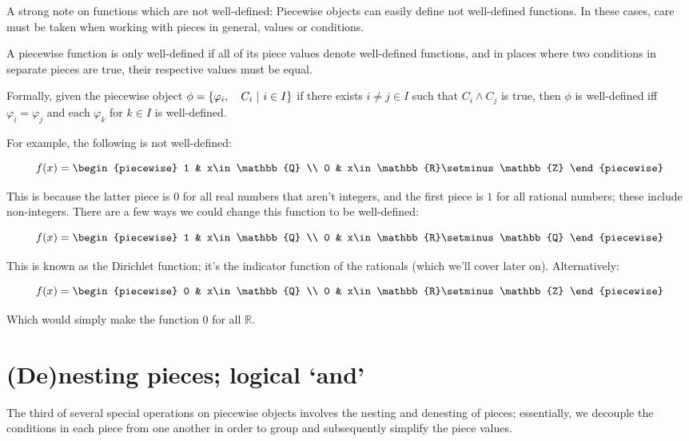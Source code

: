 A strong note on functions which are not well-defined: Piecewise objects can easily define not well-defined functions. In these cases, care must be taken when working with pieces in general, values or conditions.

\begin{theorem}
    A piecewise function is only well-defined if all of its piece values denote well-defined functions, and in places where two conditions in separate pieces are true, their respective values must be equal.

    Formally, given the piecewise object $\phi=\left\{\varphi_i,\quad C_i\ \middle|\ i\in I\right\}$ if there exists $i\neq j\in I$ such that $C_i\land C_j$ is true, then $\phi$ is well-defined iff $\varphi_i=\varphi_j$ and each $\varphi_k$ for $k\in I$ is well-defined.

    For example, the following is not well-defined:

    $$
        f(x) = \begin{piecewise}
            1 & x\in\mathbb{Q} \\
            0 & x\in\mathbb{R}\setminus\mathbb{Z}
        \end{piecewise}
    $$

    This is because the latter piece is $0$ for all real numbers that aren't integers, and the first piece is $1$ for all rational numbers; these include non-integers. There are a few ways we could change this function to be well-defined:

    $$
        f(x) = \begin{piecewise}
            1 & x\in\mathbb{Q} \\
            0 & x\in\mathbb{R}\setminus\mathbb{Q}
        \end{piecewise}
    $$

    This is known as the Dirichlet function; it's the indicator function of the rationals (which we'll cover later on). Alternatively:

    $$
        f(x) = \begin{piecewise}
            0 & x\in\mathbb{Q} \\
            0 & x\in\mathbb{R}\setminus\mathbb{Z}
        \end{piecewise}
    $$

    Which would simply make the function $0$ for all $\mathbb{R}$.
\end{theorem}

\section{(De)nesting pieces; logical `and'}
The third of several special operations on piecewise objects involves the nesting and denesting of pieces; essentially, we decouple the conditions in each piece from one another in order to group and subsequently simplify the piece values.

